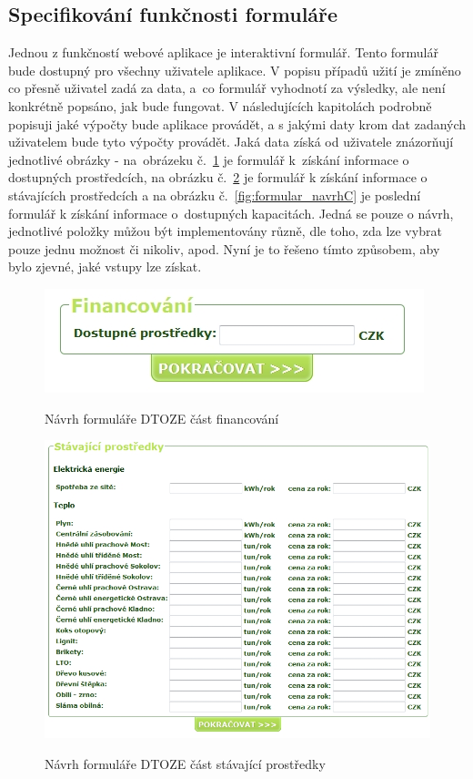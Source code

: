 \documentclass[11pt,a4paper]{article}
\begin{document}
\subsection{Specifikování funkčnosti formuláře}\label{cap:specifikovani_funkcnosti_formulare}
Jednou z funkčností webové aplikace je interaktivní formulář. Tento formulář bude dostupný pro všechny uživatele aplikace. V popisu případů užití je zmíněno co přesně uživatel zadá za data, a~co formulář vyhodnotí za výsledky, ale není konkrétně popsáno, jak bude fungovat. V následujících kapitolách podrobně popisuji jaké výpočty bude aplikace provádět, a s jakými daty krom dat zadaných uživatelem bude tyto výpočty provádět. Jaká data získá od uživatele znázorňují jednotlivé obrázky - na~obrázeku č.~\ref{fig:formular_navrhA} je formulář k~získání informace o dostupných prostředcích, na obrázku č.~\ref{fig:formular_navrhB} je formulář k získání informace o stávajících prostředcích a na obrázku č.~\ref{fig:formular_navrhC} je poslední formulář k získání informace o~dostupných kapacitách. Jedná se pouze o návrh, jednotlivé položky můžou být implementovány různě, dle toho, zda lze vybrat pouze jednu možnost či nikoliv, apod. Nyní je to řešeno tímto způsobem, aby bylo zjevné, jaké vstupy lze získat.

\begin{figure}[H] 
\centering 
\caption{Návrh formuláře DTOZE část financování} 
\includegraphics[scale=0.6]{DTOZE_formular_navrhA} 
\label{fig:formular_navrhA}
\end{figure} 

\begin{figure}[H] 
\centering 
\caption{Návrh formuláře DTOZE část stávající prostředky} 
\includegraphics[scale=0.6]{DTOZE_formular_navrhB} 
\label{fig:formular_navrhB}
\end{figure} 
\end{document}
